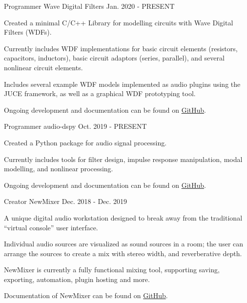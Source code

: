 \begin{cventries}
    \cventry
    {Programmer} %
    {Wave Digital Filters} %
    {} %
    {Jan. 2020 - PRESENT} %
    {
      \begin{cvitems} %
        \item {Created a minimal C/C++ Library for modelling circuits with Wave Digital Filters (WDFs).}
        \item {Currently includes WDF implementations for basic circuit elements (resistors, capacitors, inductors),
               basic circuit adaptors (series, parallel), and several nonlinear circuit elements.}
        \item {Includes several example WDF models implemented as audio plugins using the JUCE framework,
               as well as a graphical WDF prototyping tool.}
        \item {Ongoing development and documentation can be found on \href{https://github.com/jatinchowdhury18/WaveDigitalFilters}{GitHub}.}
      \end{cvitems}
    }

    \cventry
    {Programmer} %
    {audio-dspy} %
    {} %
    {Oct. 2019 - PRESENT} %
    {
      \begin{cvitems} %
        \item {Created a Python package for audio signal processing.}
        \item {Currently includes tools for filter design, impulse response manipulation, modal modelling, and nonlinear processing.}
        \item {Ongoing development and documentation can be found on \href{https://github.com/jatinchowdhury18/audio_dspy}{GitHub}.}
      \end{cvitems}
    }

  \cventry
    {Creator} %
    {NewMixer} %
    {} %
    {Dec. 2018 - Dec. 2019} %
    {
      \begin{cvitems} %
        \item {A unique digital audio workstation designed to break away from the traditional ``virtual console'' user interface.}
        \item {Individual audio sources are visualized as sound sources in a room; the user can arrange the sources to create a mix with stereo width, and reverberative depth.}
        \item {NewMixer is currently a fully functional mixing tool, supporting saving, exporting, automation, plugin hosting and more.}
        \item {Documentation of NewMixer can be found on \href{https://github.com/jatinchowdhury18/NewMixer}{GitHub}.}
      \end{cvitems}
    }


\end{cventries}
